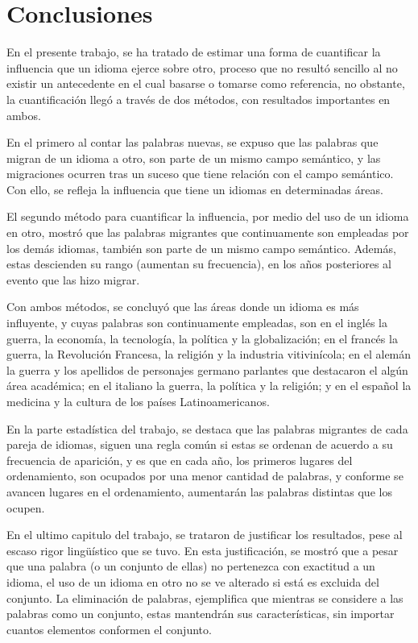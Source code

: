 \chapter{Conclusiones}

En el presente trabajo, se ha tratado de estimar una forma de cuantificar la influencia que un idioma ejerce sobre otro, proceso que no resultó sencillo al no existir un antecedente en el cual basarse o tomarse como referencia, no obstante, la cuantificación llegó a través de dos métodos, con resultados importantes en ambos. 

En el primero al contar las palabras nuevas, se expuso que las palabras que migran de un idioma a otro, son parte de un mismo campo semántico, y las migraciones ocurren tras un suceso que tiene relación con el campo semántico. Con ello, se refleja la influencia que tiene un idiomas en determinadas áreas.  

El segundo método para cuantificar la influencia, por medio del uso de un idioma en otro, mostró que las palabras migrantes que continuamente son empleadas por los demás idiomas, también son parte de un mismo campo semántico. Además, estas descienden su rango (aumentan su frecuencia), en los años posteriores al evento que las hizo migrar. 

Con ambos métodos, se concluyó que las áreas donde un idioma es más influyente, y cuyas palabras son continuamente empleadas, son en el inglés la guerra, la economía, la tecnología, la política y la globalización; en el francés la guerra, la Revolución Francesa, la religión y la industria vitivinícola; en el alemán la guerra y los apellidos de personajes germano parlantes que destacaron el algún área académica; en el italiano  la guerra, la política y la religión; y en el español la medicina y la cultura de los países Latinoamericanos. 

En la parte estadística del trabajo, se destaca que las palabras migrantes de cada pareja de idiomas, siguen una regla común si estas se ordenan de acuerdo a su frecuencia de aparición,  y es que en cada año, los primeros lugares del ordenamiento, son ocupados por una menor cantidad de palabras, y conforme se avancen lugares en el ordenamiento, aumentarán las palabras distintas que los ocupen. 

En el ultimo capitulo del trabajo, se trataron de justificar los resultados, pese al escaso rigor lingüístico que se tuvo. En esta justificación, se mostró que a pesar que una palabra (o un conjunto de ellas) no pertenezca con exactitud a un idioma,  el uso de un idioma en otro no se ve alterado si está es excluida del conjunto. La eliminación de palabras, ejemplifica que mientras se considere a las palabras como un conjunto,  estas mantendrán sus características, sin importar cuantos elementos conformen el conjunto. 





